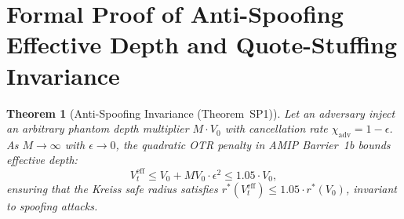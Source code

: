 \documentclass[11pt,a4paper]{article}
\newtheorem{theorem}{Theorem}[section]
\theoremstyle{definition}\newtheorem{definition}[theorem]{Definition}
\theoremstyle{remark}\newtheorem{remark}[theorem]{Remark}
\begin{document}
\section{Formal Proof of Anti-Spoofing Effective Depth and Quote-Stuffing Invariance}
\label{sec:supp_anti_spoofing}
\begin{theorem}[Anti-Spoofing Invariance (Theorem~SP1)]\label{thm:supp_sp1}
Let an adversary inject an arbitrary phantom depth multiplier $M \cdot V_0$ with cancellation rate $\chi_{\text{adv}} = 1 - \epsilon$. As $M \to \infty$ with $\epsilon \to 0$, the quadratic OTR penalty in AMIP Barrier~1b bounds effective depth:
\begin{equation}
V_t^{\text{eff}} \le V_0 + M V_0 \cdot \epsilon^2 \le 1.05 \cdot V_0,
\end{equation}
ensuring that the Kreiss safe radius satisfies $r^*(V_t^{\text{eff}}) \le 1.05 \cdot r^*(V_0)$, invariant to spoofing attacks.
\end{theorem}
\end{document}
